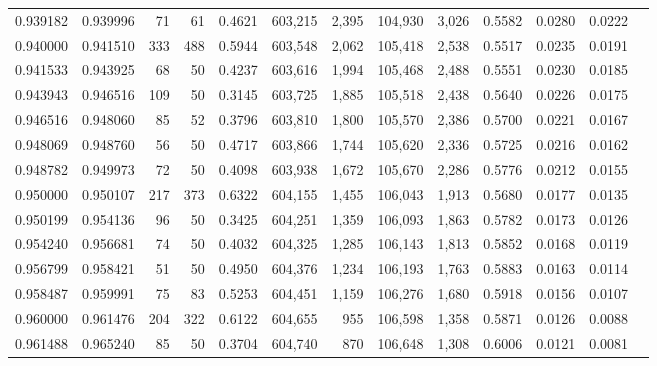 \begin{tabular}{rrrrrrrrrrrrr}
0.939182 & 0.939996 &    71 &  61 &                                     0.4621 & 603,215 &   2,395 & 104,930 &   3,026 & 0.5582 & 0.0280 & 0.0222 \\
0.940000 & 0.941510 &   333 & 488 &                                     0.5944 & 603,548 &   2,062 & 105,418 &   2,538 & 0.5517 & 0.0235 & 0.0191 \\
0.941533 & 0.943925 &    68 &  50 &                                     0.4237 & 603,616 &   1,994 & 105,468 &   2,488 & 0.5551 & 0.0230 & 0.0185 \\
0.943943 & 0.946516 &   109 &  50 &                                     0.3145 & 603,725 &   1,885 & 105,518 &   2,438 & 0.5640 & 0.0226 & 0.0175 \\
0.946516 & 0.948060 &    85 &  52 &                                     0.3796 & 603,810 &   1,800 & 105,570 &   2,386 & 0.5700 & 0.0221 & 0.0167 \\
0.948069 & 0.948760 &    56 &  50 &                                     0.4717 & 603,866 &   1,744 & 105,620 &   2,336 & 0.5725 & 0.0216 & 0.0162 \\
0.948782 & 0.949973 &    72 &  50 &                                     0.4098 & 603,938 &   1,672 & 105,670 &   2,286 & 0.5776 & 0.0212 & 0.0155 \\
0.950000 & 0.950107 &   217 & 373 &                                     0.6322 & 604,155 &   1,455 & 106,043 &   1,913 & 0.5680 & 0.0177 & 0.0135 \\
0.950199 & 0.954136 &    96 &  50 &                                     0.3425 & 604,251 &   1,359 & 106,093 &   1,863 & 0.5782 & 0.0173 & 0.0126 \\
0.954240 & 0.956681 &    74 &  50 &                                     0.4032 & 604,325 &   1,285 & 106,143 &   1,813 & 0.5852 & 0.0168 & 0.0119 \\
0.956799 & 0.958421 &    51 &  50 &                                     0.4950 & 604,376 &   1,234 & 106,193 &   1,763 & 0.5883 & 0.0163 & 0.0114 \\
0.958487 & 0.959991 &    75 &  83 &                                     0.5253 & 604,451 &   1,159 & 106,276 &   1,680 & 0.5918 & 0.0156 & 0.0107 \\
0.960000 & 0.961476 &   204 & 322 &                                     0.6122 & 604,655 &     955 & 106,598 &   1,358 & 0.5871 & 0.0126 & 0.0088 \\
0.961488 & 0.965240 &    85 &  50 &                                     0.3704 & 604,740 &     870 & 106,648 &   1,308 & 0.6006 & 0.0121 & 0.0081 \\

\end{tabular}

